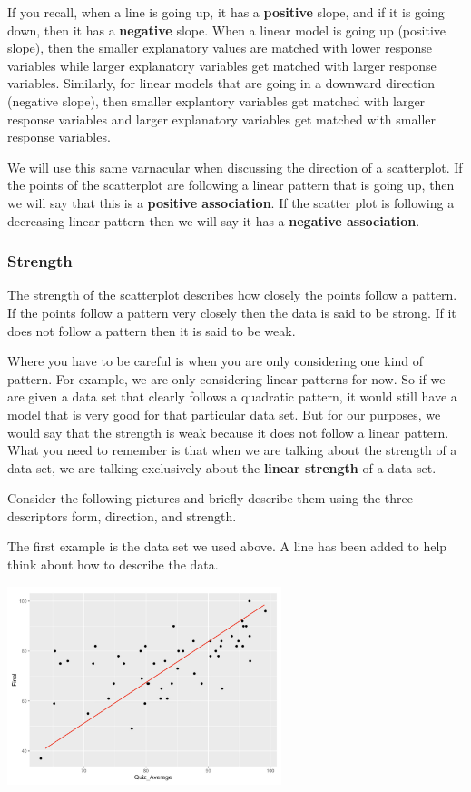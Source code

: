 \documentclass[
  letterpaper,
  DIV=11,
  numbers=noendperiod]{scrreprt}
\begin{document}
If you recall, when a line is going up, it has a \textbf{positive}
slope, and if it is going down, then it has a \textbf{negative} slope.
When a linear model is going up (positive slope), then the smaller
explanatory values are matched with lower response variables while
larger explanatory variables get matched with larger response variables.
Similarly, for linear models that are going in a downward direction
(negative slope), then smaller explantory variables get matched with
larger response variables and larger explanatory variables get matched
with smaller response variables.

We will use this same varnacular when discussing the direction of a
scatterplot. If the points of the scatterplot are following a linear
pattern that is going up, then we will say that this is a
\textbf{positive association}. If the scatter plot is following a
decreasing linear pattern then we will say it has a \textbf{negative
association}.

\subsubsection*{Strength}\label{strength}

The strength of the scatterplot describes how closely the points follow
a pattern. If the points follow a pattern very closely then the data is
said to be strong. If it does not follow a pattern then it is said to be
weak.

Where you have to be careful is when you are only considering one kind
of pattern. For example, we are only considering linear patterns for
now. So if we are given a data set that clearly follows a quadratic
pattern, it would still have a model that is very good for that
particular data set. But for our purposes, we would say that the
strength is weak because it does not follow a linear pattern. What you
need to remember is that when we are talking about the strength of a
data set, we are talking exclusively about the \textbf{linear strength}
of a data set.

Consider the following pictures and briefly describe them using the
three descriptors form, direction, and strength.

The first example is the data set we used above. A line has been added
to help think about how to describe the data.

\includegraphics[width=0.6\textwidth,height=\textheight]{./images/SC_1.jpg}
\end{document}
